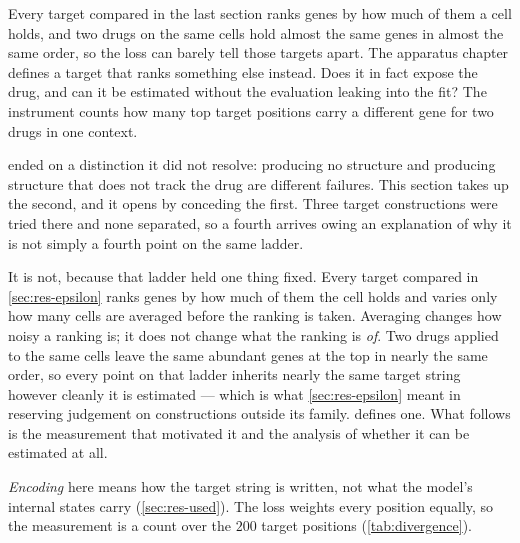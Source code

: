 

\begin{question}[5]
  Every target compared in the last section ranks genes by how much of them a cell
  holds, and two drugs on the same cells hold almost the same genes in almost the
  same order, so the loss can barely tell those targets apart. The apparatus chapter
  defines a target that ranks something else instead. Does it in fact expose the
  drug, and can it be estimated without the evaluation leaking into the fit? The
  instrument counts how many top target positions carry a different gene for two
  drugs in one context. 
  \end{question}

  \noindent
   ended on a distinction it did not resolve: producing no
  structure and producing structure that does not track the drug are different
  failures. This section takes up the second, and it opens by conceding the first.
  Three target constructions were tried there and none separated, so a fourth
  arrives owing an explanation of why it is not simply a fourth point on the same
  ladder.
  
  It is not, because that ladder held one thing fixed. Every target compared in
  \cref{sec:res-epsilon} ranks genes by how much of them the cell holds and varies only
  how many cells are averaged before the ranking is taken. Averaging changes how
  noisy a ranking is; it does not change what the ranking is \emph{of}. Two drugs
  applied to the same cells leave the same abundant genes at the top in nearly the
  same order, so every point on that ladder inherits nearly the same target string
  however cleanly it is estimated --- which is what \cref{sec:res-epsilon} meant in
  reserving judgement on constructions outside its family.
   defines one. What follows is the measurement that
  motivated it and the analysis of whether it can be estimated at all.
  
  \emph{Encoding} here means how the target string is written, not what the model's
  internal states carry (\cref{sec:res-used}). The loss weights every position
  equally, so the measurement is a count over the $200$ target positions
  (\cref{tab:divergence}).
  
